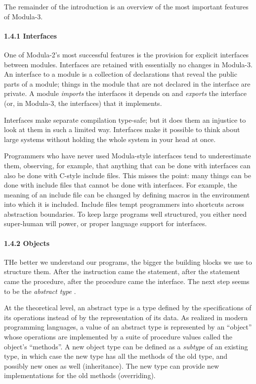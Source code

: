 \documentclass[10pt]{article}
\begin{document}
The remainder of the introduction is an overview of the most important
features of Modula-3.

\paragraph{1.4.1 Interfaces}

One of Modula-2's most successful features is the provision for explicit
interfaces between modules. Interfaces are retained with essentially no
changes in Modula-3. An interface to a module is a collection of declarations
that reveal the public parts of a module; things in the module that are not
declared in the interface are private. A module \emph{imports} the interfaces
it depends on and \emph{exports} the interface (or, in Modula-3, the
interfaces) that it implements.

Interfaces make separate compilation type-safe; but it does them an injustice
to look at them in such a limited way. Interfaces make it possible to think
about large systems without holding the whole system in your head at once.

Programmers who have never used Modula-style interfaces tend to underestimate
them, observing, for example, that anything that can be done with interfaces
can also be done with C-style include files. This misses the point: many
things can be done with include files that cannot be done with interfaces. For
example, the meaning of an include file can be changed by defining macros in
the environment into which it is included. Include files tempt programmers
into shortcuts across abstraction boundaries. To keep large programs well
structured, you either need super-human will power, or proper language support
for interfaces.

\paragraph{1.4.2 Objects}

THe better we understand our programs, the bigger the building blocks we use
to structure them. After the instruction came the statement, after the
statement came the procedure, after the procedure came the interface. The next
step seems to be the \emph{abstract type} .

At the theoretical level, an abstract type is a type defined by the
specifications of its operations instead of by the representation of its
data. As realized in modern programming languages, a value of an abstract type
is represented by an ``object'' whose operations are implemented by a suite of
procedure values called the object's ``methods''. A new object type can be
defined as a \emph{subtype} of an existing type, in which case the new type
has all the methods of the old type, and possibly new ones as well
(inheritance). The new type can provide new implementations for the old
methods (overriding).
\end{document}
